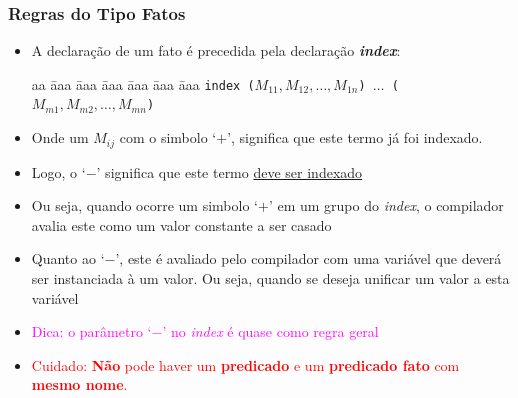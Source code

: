         
\begin{frame} [fragile]
\frametitle{Regras do Tipo  Fatos}


    \begin{itemize}
        
        \item A declaração de um fato é precedida pela declaração \textbf{\emph{index}}:
        
        \begin{tabbing}
        aa \= aaa \= aaa \= aaa \= aaa \= aaa \= aaa \kill
            \> \texttt{index ($M_{11},M_{12},\ldots,M_{1n}$) $\ldots$ ($M_{m1},M_{m2},\ldots,M_{mn}$)} 
        \end{tabbing}
        
        \pause
        \item Onde um $M_{ij}$ com o simbolo `$+$',  significa que este termo já foi 
        indexado.
        
        \item Logo,  o `$-$' significa que este termo \underline{deve ser indexado}
        
        \item Ou seja, quando ocorre um simbolo `$+$' em um grupo do \textit{index}, 
        o compilador  avalia este como um valor constante a ser casado
        
        
        \item Quanto ao `$-$', este é avaliado pelo compilador com uma variável que deverá ser 
        instanciada à um valor. Ou seja, quando se deseja unificar um valor a esta variável
        
        \pause
        \item \textcolor{magenta}{Dica: o parâmetro `$-$' no \textit{index} é quase como regra geral}
             
       \pause
        \item \textcolor{red}{Cuidado: \textbf{Não} pode haver um \textbf{predicado} e um \textbf{predicado 
        fato} com \textbf{mesmo nome}.}
        
    \end{itemize}
\end{frame}



